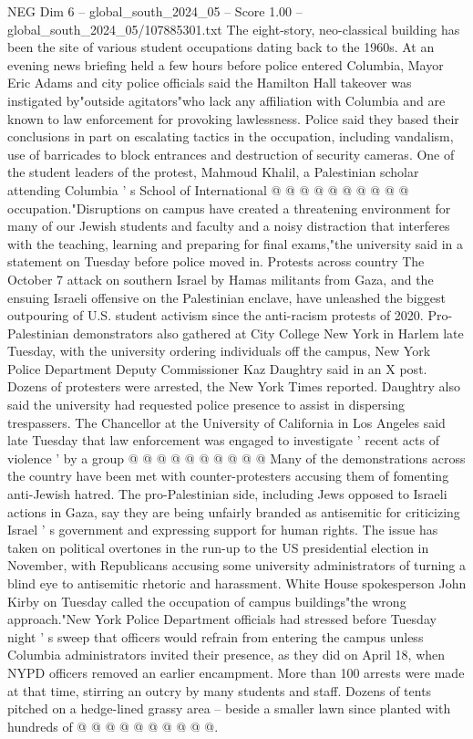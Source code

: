 \begin{textsample}{NEG Dim 6 – global\_south\_2024\_05 – Score 1.00 – global\_south\_2024\_05/107885301.txt}
The eight-story, neo-classical building has been the site of various student occupations dating back to the 1960s.
At an evening news briefing held a few hours before police entered Columbia, Mayor Eric Adams and city police officials said the Hamilton Hall takeover was instigated by"outside agitators"who lack any affiliation with Columbia and are known to law enforcement for provoking lawlessness.
Police said they based their conclusions in part on escalating tactics in the occupation, including vandalism, use of barricades to block entrances and destruction of security cameras.
One of the student leaders of the protest, Mahmoud Khalil, a Palestinian scholar attending Columbia ' s School of International @ @ @ @ @ @ @ @ @ @ occupation."Disruptions on campus have created a threatening environment for many of our Jewish students and faculty and a noisy distraction that interferes with the teaching, learning and preparing for final exams,"the university said in a statement on Tuesday before police moved in.
Protests across country The October 7 attack on southern Israel by Hamas militants from Gaza, and the ensuing Israeli offensive on the Palestinian enclave, have unleashed the biggest outpouring of U.S. student activism since the anti-racism protests of 2020.
Pro-Palestinian demonstrators also gathered at City College New York in Harlem late Tuesday, with the university ordering individuals off the campus, New York Police Department Deputy Commissioner Kaz Daughtry said in an X post.
Dozens of protesters were arrested, the New York Times reported.
Daughtry also said the university had requested police presence to assist in dispersing trespassers.
The Chancellor at the University of California in Los Angeles said late Tuesday that law enforcement was engaged to investigate ' recent acts of violence ' by a group @ @ @ @ @ @ @ @ @ @ Many of the demonstrations across the country have been met with counter-protesters accusing them of fomenting anti-Jewish hatred.
The pro-Palestinian side, including Jews opposed to Israeli actions in Gaza, say they are being unfairly branded as antisemitic for criticizing Israel ' s government and expressing support for human rights.
The issue has taken on political overtones in the run-up to the US presidential election in November, with Republicans accusing some university administrators of turning a blind eye to antisemitic rhetoric and harassment.
White House spokesperson John Kirby on Tuesday called the occupation of campus buildings"the wrong approach."New York Police Department officials had stressed before Tuesday night ' s sweep that officers would refrain from entering the campus unless Columbia administrators invited their presence, as they did on April 18, when NYPD officers removed an earlier encampment.
More than 100 arrests were made at that time, stirring an outcry by many students and staff.
Dozens of tents pitched on a hedge-lined grassy area -- beside a smaller lawn since planted with hundreds of @ @ @ @ @ @ @ @ @ @.

\end{textsample}
